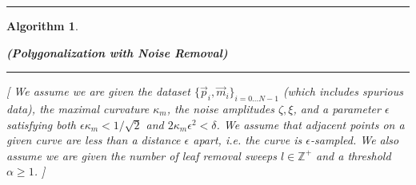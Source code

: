 \documentclass{article}
\newtheorem{algo}{Algorithm}
\numberwithin{cntr}{section}
\numberwithin{equation}{section}
\newcommand{\vp}[0]{{\vec{p}}}
\newcommand{\vm}[0]{{\vec{m}}}
\newcommand{\OtoN}{{0 \ldots N-1}}
\newcommand{\allData}{{ \{ \vp_{i}, \vm_{i} \}_{i=\OtoN} }}
\newcommand{\curvemax}{{\kappa_{m}}}
\newcommand{\curvesep}{{\delta}}
\newcommand{\pointNoise}{{\zeta}}
\newcommand{\tanNoise}{{\xi}}
\begin{document}
\hrule
\begin{algo}
  \label{algo:noisyPolygonalization}
  \begin{center}
  {\bf (Polygonalization with Noise Removal)}
  \end{center}

\vspace{.1in}

\hrule

\vspace{.2in}


[ We assume we are given the dataset $\allData$ (which includes spurious data),
the maximal curvature
$\curvemax$, the noise amplitudes $\pointNoise, \tanNoise$, and a
parameter $\epsilon$ satisfying both $\epsilon \curvemax < 1/\sqrt{2}$ and
$2 \curvemax \epsilon^{2} < \curvesep$.
We assume that adjacent points on a given curve
are less than a distance $\epsilon$ apart, i.e. the curve is
$\epsilon$-sampled. We also assume we are given the number of
leaf removal sweeps $l \in \mathbb{Z}^{+}$ and a
threshold $\alpha \geq 1$. ]

\vspace{.1in}


\end{algo}
\end{document}
